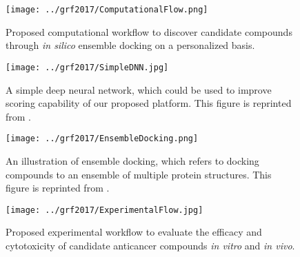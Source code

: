 \documentclass[a4paper,12pt]{article}
\begin{document}
\begin{figure}[h!]
\centering
\texttt{[image: ../grf2017/ComputationalFlow.png]}
\caption{Proposed computational workflow to discover candidate compounds through \textit{in silico} ensemble docking on a personalized basis.}
\label{fig:ComputationalFlow}
\end{figure}

\begin{figure}[h!]
\centering
\texttt{[image: ../grf2017/SimpleDNN.jpg]}
\caption{A simple deep neural network, which could be used to improve scoring capability of our proposed platform. This figure is reprinted from \citep{1810}.}
\label{fig:SimpleDNN}
\end{figure}

\begin{figure}[h!]
\centering
\texttt{[image: ../grf2017/EnsembleDocking.png]}
\caption{An illustration of ensemble docking, which refers to docking compounds to an ensemble of multiple protein structures. This figure is reprinted from \citep{1811}.}
\label{fig:EnsembleDocking}
\end{figure}

\begin{figure}[h!]
\centering
\texttt{[image: ../grf2017/ExperimentalFlow.jpg]}
\caption{Proposed experimental workflow to evaluate the efficacy and cytotoxicity of candidate anticancer compounds \textit{in vitro} and \textit{in vivo}.}
\label{fig:ExperimentalFlow}
\end{figure}
\end{document}

